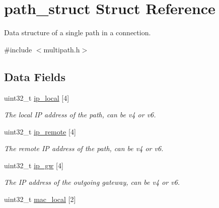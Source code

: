 \hypertarget{structpath__struct}{\section{path\-\_\-struct Struct Reference}
\label{structpath__struct}
}


Data structure of a single path in a connection.  




{\ttfamily \#include $<$multipath.\-h$>$}

\subsection*{Data Fields}
\begin{DoxyCompactItemize}
\item 
\hypertarget{structpath__struct_ad51f6dc7a8badde7dea8df80f546c879}{uint32\-\_\-t \hyperlink{structpath__struct_ad51f6dc7a8badde7dea8df80f546c879}{ip\-\_\-local} \mbox{[}4\mbox{]}}\label{structpath__struct_ad51f6dc7a8badde7dea8df80f546c879}

\begin{DoxyCompactList}\small\item\em The local I\-P address of the path, can be v4 or v6. \end{DoxyCompactList}\item 
\hypertarget{structpath__struct_a54a3f7add1f1d4f2d3f00c09df51eee2}{uint32\-\_\-t \hyperlink{structpath__struct_a54a3f7add1f1d4f2d3f00c09df51eee2}{ip\-\_\-remote} \mbox{[}4\mbox{]}}\label{structpath__struct_a54a3f7add1f1d4f2d3f00c09df51eee2}

\begin{DoxyCompactList}\small\item\em The remote I\-P address of the path, can be v4 or v6. \end{DoxyCompactList}\item 
\hypertarget{structpath__struct_a838a5bc874cef3a7fc2d3fb6e967b033}{uint32\-\_\-t \hyperlink{structpath__struct_a838a5bc874cef3a7fc2d3fb6e967b033}{ip\-\_\-gw} \mbox{[}4\mbox{]}}\label{structpath__struct_a838a5bc874cef3a7fc2d3fb6e967b033}

\begin{DoxyCompactList}\small\item\em The I\-P address of the outgoing gateway, can be v4 or v6. \end{DoxyCompactList}\item 
\hypertarget{structpath__struct_a828b54e71e8307e9ea1f1933993d16aa}{uint32\-\_\-t \hyperlink{structpath__struct_a828b54e71e8307e9ea1f1933993d16aa}{mac\-\_\-local} \mbox{[}2\mbox{]}}\label{structpath__struct_a828b54e71e8307e9ea1f1933993d16aa}


\end{DoxyCompactItemize}
